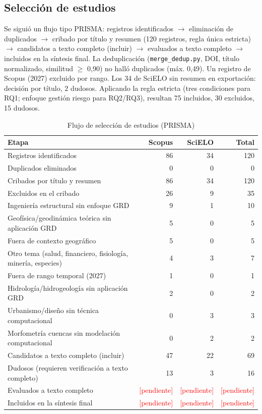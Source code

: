 \documentclass[12pt,a4paper]{article}
\newcommand{\relleno}[1]{\textcolor{red}{[#1]}}
\begin{document}
\subsection{Selección de estudios}
Se siguió un flujo tipo PRISMA: registros identificados $\rightarrow$ eliminación de duplicados $\rightarrow$ cribado por título y resumen (120 registros, regla única estricta) $\rightarrow$ candidatos a texto completo (incluir) $\rightarrow$ evaluados a texto completo $\rightarrow$ incluidos en la síntesis final. La deduplicación (\texttt{merge\_dedup.py}, DOI, título normalizado, similitud $\ge$ 0,90) no halló duplicados (máx. 0,49). Un registro de Scopus (2027) excluido por rango. Los 34 de SciELO sin resumen en exportación: decisión por título, 2 dudosos. Aplicando la regla estricta (tres condiciones para RQ1; enfoque gestión riesgo para RQ2/RQ3), resultan 75 incluidos, 30 excluidos, 15 dudosos.

\begin{table}[ht]
  \centering
  \caption{Flujo de selección de estudios (PRISMA)}
  \label{tab:flujo}
  \begin{tabular}{@{}lrrr@{}}
    \toprule
    Etapa & Scopus & SciELO & Total \\
    \midrule
    Registros identificados & 86 & 34 & 120 \\
    Duplicados eliminados & 0 & 0 & 0 \\
    Cribados por título y resumen & 86 & 34 & 120 \\
    Excluidos en el cribado & 26 & 9 & 35 \\
    \quad\quad Ingeniería estructural sin enfoque GRD & 9 & 1 & 10 \\
    \quad\quad Geofísica/geodinámica teórica sin aplicación GRD & 5 & 0 & 5 \\
    \quad\quad Fuera de contexto geográfico & 5 & 0 & 5 \\
    \quad\quad Otro tema (salud, financiero, fisiología, minería, especies) & 4 & 3 & 7 \\
    \quad\quad Fuera de rango temporal (2027) & 1 & 0 & 1 \\
    \quad\quad Hidrología/hidrogeología sin aplicación GRD & 2 & 0 & 2 \\
    \quad\quad Urbanismo/diseño sin técnica computacional & 0 & 3 & 3 \\
    \quad\quad Morfometría cuencas sin modelación computacional & 0 & 2 & 2 \\
    Candidatos a texto completo (incluir) & 47 & 22 & 69 \\
    Dudosos (requieren verificación a texto completo) & 13 & 3 & 16 \\
    Evaluados a texto completo & \relleno{pendiente} & \relleno{pendiente} & \relleno{pendiente} \\
    Incluidos en la síntesis final & \relleno{pendiente} & \relleno{pendiente} & \relleno{pendiente} \\
    \bottomrule
  \end{tabular}
\end{table}
\end{document}
